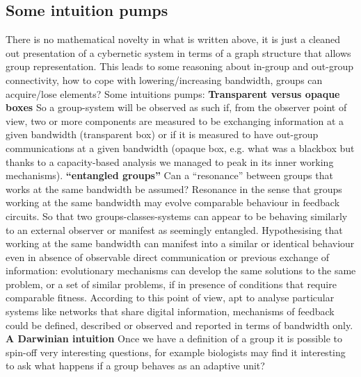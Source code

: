 \documentclass[14pt]{extarticle}
\begin{document}
\subsection*{Some intuition pumps}
\label{subsec:cyb_pumps}
\hspace*{15mm}There is no mathematical novelty in what is written above, it is just a cleaned out presentation of a cybernetic system in terms of a graph structure that allows group representation. This leads to some reasoning about in-group and out-group connectivity, how to cope with lowering/increasing bandwidth, groups can acquire/lose elements? Some intuitions pumps:
\newline
\hspace*{15mm}\textbf{Transparent versus opaque boxes}
\newline
\hspace*{15mm}So a group-system will be observed as such if, from the observer point of view, two or more components are measured to be exchanging information at a given bandwidth (transparent box) or if it is measured to have out-group communications at a given bandwidth (opaque box, e.g. what was a blackbox but thanks to a capacity-based analysis we managed to peak in its inner working mechanisms).
\newline
\hspace*{15mm}\textbf{“entangled groups”}
\newline
\hspace*{15mm}Can a “resonance” between groups that works at the same bandwidth be assumed? Resonance in the sense that groups working at the same bandwidth may evolve comparable behaviour in feedback circuits. So that two groups-classes-systems can appear to be behaving similarly to an external observer or manifest as seemingly entangled. Hypothesising that working at the same bandwidth can manifest into a similar or identical behaviour even in absence of observable direct communication or previous exchange of information: evolutionary mechanisms can develop the same solutions to the same problem, or a set of similar problems, if in presence of conditions that require comparable fitness. According to this point of view, apt to analyse particular systems like networks that share digital information, mechanisms of feedback could be defined, described or observed and reported in terms of bandwidth only.
\newline
\hspace*{15mm}\textbf{A Darwinian intuition}
\newline
Once we have a definition of a group it is possible to spin-off very interesting questions, for example biologists may find it interesting to ask what happens if a group behaves as an adaptive unit?
\end{document}
